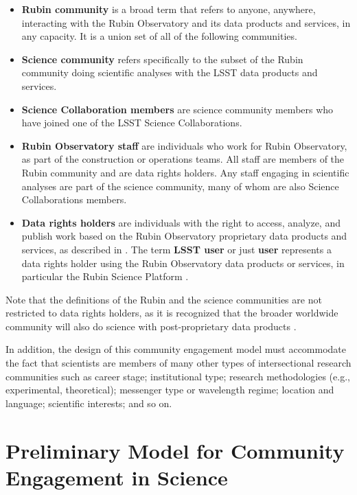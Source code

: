 \documentclass[DM,lsstdraft,toc]{lsstdoc}
\begin{document}
\begin{itemize}
\item \textbf{Rubin community} is a broad term that refers to anyone, anywhere, interacting with the Rubin Observatory and its data products and services, in any capacity. It is a union set of all of the following communities.
\item \textbf{Science community} refers specifically to the subset of the Rubin community doing scientific analyses with the LSST data products and services.
\item \textbf{Science Collaboration members} are science community members who have joined one of the LSST Science Collaborations.
\item \textbf{Rubin Observatory staff} are individuals who work for Rubin Observatory, as part of the construction or operations teams. All staff are members of the Rubin community and are data rights holders. Any staff engaging in scientific analyses are part of the science community, many of whom are also Science Collaborations members.
\item \textbf{Data rights holders} are individuals with the right to access, analyze, and publish work based on the Rubin Observatory proprietary data products and services, as described in . The term \textbf{LSST user} or just \textbf{user} represents a data rights holder using the Rubin Observatory data products or services, in particular the Rubin Science Platform .
\end{itemize}

Note that the definitions of the Rubin and the science communities are not restricted to data rights holders, as it is recognized that the broader worldwide community will also do science with post-proprietary data products .

In addition, the design of this community engagement model must accommodate the fact that scientists are members of many other types of intersectional research communities such as career stage; institutional type; research methodologies (e.g., experimental, theoretical); messenger type or wavelength regime; location and language; scientific interests; and so on.



\section{Preliminary Model for Community Engagement in Science}\label{sec:mod}
\end{document}

